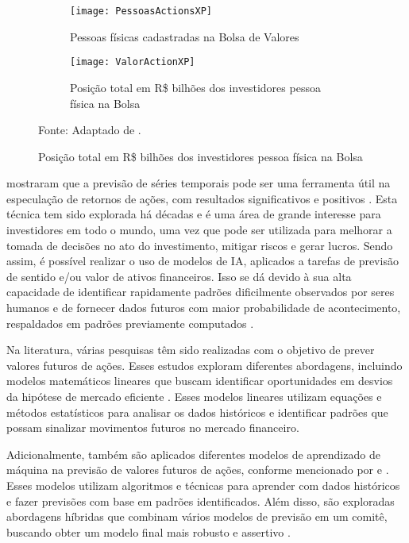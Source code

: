 \begin{figure}
     \centering
     \caption{Dados da bolsa de valores brasileira}
     \begin{subfigure}[b]{0.48\textwidth}
         \centering
         \texttt{[image: PessoasActionsXP]}
         \caption{Pessoas físicas cadastradas na Bolsa de Valores}
         \label{fig:PessoasActionsXP} 
     \end{subfigure}
     \hfill
     \begin{subfigure}[b]{0.48\textwidth}
         \centering
         \texttt{[image: ValorActionXP]}
         \caption{Posição total em R\$ bilhões dos investidores pessoa física na Bolsa}
         \label{fig:ValorActionXP}
     \end{subfigure}

     Fonte: Adaptado de .
\end{figure}

 mostraram que a previsão de séries temporais pode ser uma ferramenta útil na especulação de retornos de ações, com resultados significativos e positivos \cite{Gonzalo_Estimation2}. Esta técnica tem sido explorada há décadas e é uma área de grande interesse para investidores em todo o mundo, uma vez que pode ser utilizada para melhorar a tomada de decisões no ato do investimento, mitigar riscos e gerar lucros. Sendo assim, é possível realizar o uso de modelos de \ac{IA}, aplicados a tarefas de previsão de sentido e/ou valor de ativos financeiros. Isso se dá devido à sua alta capacidade de identificar rapidamente padrões dificilmente observados por seres humanos e de fornecer dados futuros com maior probabilidade de acontecimento, respaldados em padrões previamente computados \cite{Jerzy_Deep}.

Na literatura, várias pesquisas têm sido realizadas com o objetivo de prever valores futuros de ações. Esses estudos exploram diferentes abordagens, incluindo modelos matemáticos lineares que buscam identificar oportunidades em desvios da hipótese de mercado eficiente \cite{Charlene}. Esses modelos lineares utilizam equações e métodos estatísticos para analisar os dados históricos e identificar padrões que possam sinalizar movimentos futuros no mercado financeiro.

Adicionalmente, também são aplicados diferentes modelos de aprendizado de máquina na previsão de valores futuros de ações, conforme mencionado por  e . Esses modelos utilizam algoritmos e técnicas para aprender com dados históricos e fazer previsões com base em padrões identificados.
Além disso, são exploradas abordagens híbridas que combinam vários modelos de previsão em um comitê, buscando obter um modelo final mais robusto e assertivo \cite{Jerzy_Deep}. 

